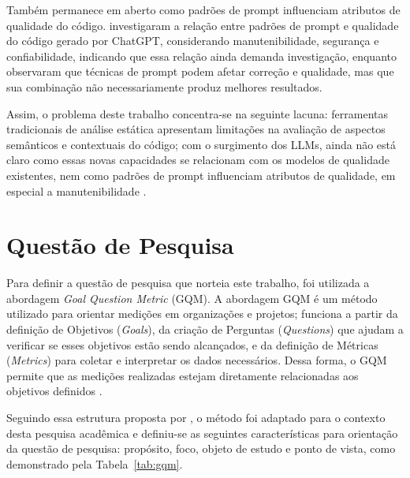 Também permanece em aberto como padrões de prompt influenciam atributos de qualidade do código.  investigaram a relação entre padrões de prompt e qualidade do código gerado por ChatGPT, considerando manutenibilidade, segurança e confiabilidade, indicando que essa relação ainda demanda investigação, enquanto  observaram que técnicas de prompt podem afetar correção e qualidade, mas que sua combinação não necessariamente produz melhores resultados.

Assim, o problema deste trabalho concentra-se na seguinte lacuna: ferramentas tradicionais de análise estática apresentam limitações na avaliação de aspectos semânticos e contextuais do código; com o surgimento dos LLMs, ainda não está claro como essas novas capacidades se relacionam com os modelos de qualidade existentes, nem como padrões de prompt influenciam atributos de qualidade, em especial a manutenibilidade \cite{DellaPortaEtAll, KhojahEtAll}.

\section{Questão de Pesquisa} \label{sec:questao_de_pesquisa}

Para definir a questão de pesquisa que norteia este trabalho, foi utilizada a abordagem \textit{Goal Question Metric} (GQM). A abordagem GQM é um método utilizado para orientar medições em organizações e projetos; funciona a partir da definição de Objetivos (\textit{Goals}), da criação de Perguntas (\textit{Questions}) que ajudam a verificar se esses objetivos estão sendo alcançados, e da definição de Métricas (\textit{Metrics}) para coletar e interpretar os dados necessários. Dessa forma, o GQM permite que as medições realizadas estejam diretamente relacionadas aos objetivos definidos \cite{BasiliEtAll}.

Seguindo essa estrutura proposta por , o método foi adaptado para o contexto desta pesquisa acadêmica e definiu-se as seguintes características para orientação da questão de pesquisa: propósito, foco, objeto de estudo e ponto de vista, como demonstrado pela Tabela~\ref{tab:gqm}.

